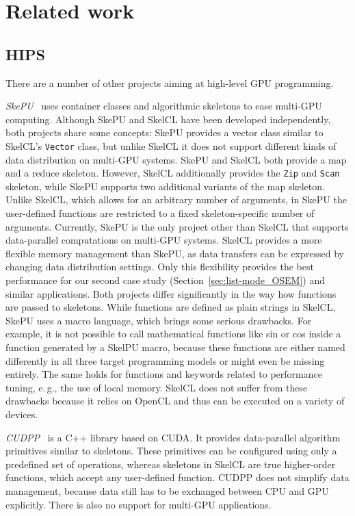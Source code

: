 \section{Related work}

\subsection{HIPS}

There are a number of other projects aiming at high-level GPU programming.

\emph{SkePU}~\cite{EnmyrenKe10} uses container classes and algorithmic skeletons to ease multi-GPU computing.
Although SkePU and SkelCL have been developed independently, both projects share some concepts:
SkePU provides a vector class similar to SkelCL's \texttt{Vector} class, but unlike SkelCL it does not support different kinds of data distribution on multi-GPU systems.
SkePU and SkelCL both provide a map and a reduce skeleton.
However, SkelCL additionally provides the \texttt{Zip} and \texttt{Scan} skeleton, while SkePU supports two additional variants of the map skeleton.
Unlike SkelCL, which allows for an arbitrary number of arguments, in SkePU the user-defined functions are restricted to a fixed skeleton-specific number of arguments.
Currently, SkePU is the only project other than SkelCL that supports data-parallel computations on multi-GPU systems.
SkelCL provides a more flexible memory management than SkePU, as data transfers can be expressed by changing data distribution settings.
Only this flexibility provides the best performance for our second case study (Section~\ref{sec:list-mode_OSEM}) and similar applications.
Both projects differ significantly in the way how functions are passed to skeletons.
While functions are defined as plain strings in SkelCL, SkePU uses a macro language, which brings some serious drawbacks.
For example, it is not possible to call mathematical functions like sin or cos inside a function generated by a SkelPU macro,
because these functions are either named differently in all three target programming models or might even be missing entirely.
The same holds for functions and keywords related to performance tuning, e.\,g., the use of local memory.
SkelCL does not suffer from these drawbacks because it relies on OpenCL and thus can be executed on a variety of devices.

\emph{CUDPP}~\cite{SenguptaHZO07} is a C++ library based on CUDA.
It provides data-parallel algorithm primitives similar to skeletons.
These primitives can be configured using only a predefined set of operations, whereas
skeletons in SkelCL are true higher-order functions, which accept any user-defined function.
CUDPP does not simplify data management, because data still has to be exchanged between CPU and GPU explicitly.
There is also no support for multi-GPU applications.

